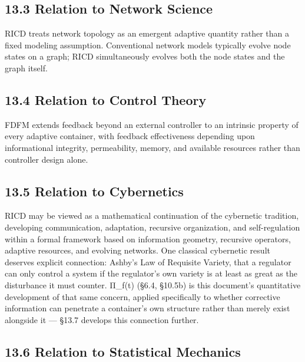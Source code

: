\documentclass[
]{article}
\begin{document}
\hypertarget{relation-to-network-science}{%
\subsection{13.3 Relation to Network
Science}\label{relation-to-network-science}}

RICD treats network topology as an emergent adaptive quantity rather
than a fixed modeling assumption. Conventional network models typically
evolve node states on a graph; RICD simultaneously evolves both the node
states and the graph itself.

\hypertarget{relation-to-control-theory}{%
\subsection{13.4 Relation to Control
Theory}\label{relation-to-control-theory}}

FDFM extends feedback beyond an external controller to an intrinsic
property of every adaptive container, with feedback effectiveness
depending upon informational integrity, permeability, memory, and
available resources rather than controller design alone.

\hypertarget{relation-to-cybernetics}{%
\subsection{13.5 Relation to
Cybernetics}\label{relation-to-cybernetics}}

RICD may be viewed as a mathematical continuation of the cybernetic
tradition, developing communication, adaptation, recursive organization,
and self-regulation within a formal framework based on information
geometry, recursive operators, adaptive resources, and evolving
networks. One classical cybernetic result deserves explicit connection:
Ashby's Law of Requisite Variety, that a regulator can only control a
system if the regulator's own variety is at least as great as the
disturbance it must counter. Π\_f(t) (§6.4, §10.5b) is this document's
quantitative development of that same concern, applied specifically to
whether corrective information can penetrate a container's own structure
rather than merely exist alongside it --- §13.7 develops this connection
further.

\hypertarget{relation-to-statistical-mechanics}{%
\subsection{13.6 Relation to Statistical
Mechanics}\label{relation-to-statistical-mechanics}}
\end{document}
